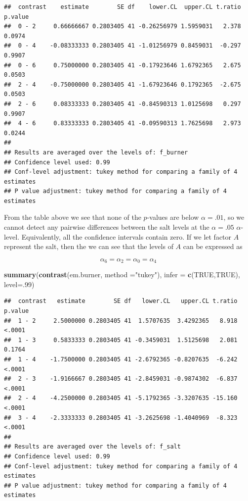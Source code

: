 \documentclass[12pt,]{article}
\newenvironment{Shaded}{\begin{snugshade}}{\end{snugshade}}
\newcommand{\KeywordTok}[1]{\textcolor[rgb]{0.13,0.29,0.53}{\textbf{#1}}}
\newcommand{\DataTypeTok}[1]{\textcolor[rgb]{0.13,0.29,0.53}{#1}}
\newcommand{\DecValTok}[1]{\textcolor[rgb]{0.00,0.00,0.81}{#1}}
\newcommand{\StringTok}[1]{\textcolor[rgb]{0.31,0.60,0.02}{#1}}
\newcommand{\OtherTok}[1]{\textcolor[rgb]{0.56,0.35,0.01}{#1}}
\newcommand{\NormalTok}[1]{#1}
\begin{document}
\begin{verbatim}
##  contrast    estimate        SE df    lower.CL  upper.CL t.ratio p.value
##  0 - 2     0.66666667 0.2803405 41 -0.26256979 1.5959031   2.378  0.0974
##  0 - 4    -0.08333333 0.2803405 41 -1.01256979 0.8459031  -0.297  0.9907
##  0 - 6     0.75000000 0.2803405 41 -0.17923646 1.6792365   2.675  0.0503
##  2 - 4    -0.75000000 0.2803405 41 -1.67923646 0.1792365  -2.675  0.0503
##  2 - 6     0.08333333 0.2803405 41 -0.84590313 1.0125698   0.297  0.9907
##  4 - 6     0.83333333 0.2803405 41 -0.09590313 1.7625698   2.973  0.0244
## 
## Results are averaged over the levels of: f_burner 
## Confidence level used: 0.99 
## Conf-level adjustment: tukey method for comparing a family of 4 estimates 
## P value adjustment: tukey method for comparing a family of 4 estimates
\end{verbatim}

From the table above we see that none of the \(p\)-values are below
\(\alpha = .01\), so we cannot detect any pairwise differences between
the salt levels at the \(\alpha=.05\) \(\alpha\)-level. Equivalently,
all the confidence intervals contain zero. If we let factor \(A\)
represent the salt, then the we can see that the levels of \(A\) can be
expressed as

\[
\alpha_6 = \alpha_2 = \alpha_0 = \alpha_4
\]

\begin{Shaded}
\begin{Highlighting}[]
\KeywordTok{summary}\NormalTok{(}\KeywordTok{contrast}\NormalTok{(em.burner, }\DataTypeTok{method =}\StringTok{"tukey"}\NormalTok{), }\DataTypeTok{infer =} \KeywordTok{c}\NormalTok{(}\OtherTok{TRUE}\NormalTok{,}\OtherTok{TRUE}\NormalTok{), }\DataTypeTok{level=}\NormalTok{.}\DecValTok{99}\NormalTok{)}
\end{Highlighting}
\end{Shaded}

\begin{verbatim}
##  contrast   estimate        SE df   lower.CL   upper.CL t.ratio p.value
##  1 - 2     2.5000000 0.2803405 41  1.5707635  3.4292365   8.918  <.0001
##  1 - 3     0.5833333 0.2803405 41 -0.3459031  1.5125698   2.081  0.1764
##  1 - 4    -1.7500000 0.2803405 41 -2.6792365 -0.8207635  -6.242  <.0001
##  2 - 3    -1.9166667 0.2803405 41 -2.8459031 -0.9874302  -6.837  <.0001
##  2 - 4    -4.2500000 0.2803405 41 -5.1792365 -3.3207635 -15.160  <.0001
##  3 - 4    -2.3333333 0.2803405 41 -3.2625698 -1.4040969  -8.323  <.0001
## 
## Results are averaged over the levels of: f_salt 
## Confidence level used: 0.99 
## Conf-level adjustment: tukey method for comparing a family of 4 estimates 
## P value adjustment: tukey method for comparing a family of 4 estimates
\end{verbatim}
\end{document}
